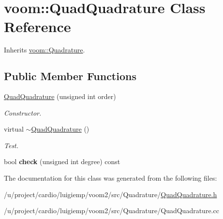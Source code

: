 \hypertarget{classvoom_1_1_quad_quadrature}{
\section{voom::QuadQuadrature Class Reference}
\label{classvoom_1_1_quad_quadrature}
}


Inherits \hyperlink{classvoom_1_1_quadrature}{voom::Quadrature}.\subsection*{Public Member Functions}
\begin{DoxyCompactItemize}
\item 
\hypertarget{classvoom_1_1_quad_quadrature_ad911cb1165ee336da4fc4375b772ca28}{
\hyperlink{classvoom_1_1_quad_quadrature_ad911cb1165ee336da4fc4375b772ca28}{QuadQuadrature} (unsigned int order)}
\label{classvoom_1_1_quad_quadrature_ad911cb1165ee336da4fc4375b772ca28}

\begin{DoxyCompactList}\small\item\em Constructor. \item\end{DoxyCompactList}\item 
\hypertarget{classvoom_1_1_quad_quadrature_ab14e886da0e6b67d44482553b23f9dd2}{
virtual \hyperlink{classvoom_1_1_quad_quadrature_ab14e886da0e6b67d44482553b23f9dd2}{$\sim$QuadQuadrature} ()}
\label{classvoom_1_1_quad_quadrature_ab14e886da0e6b67d44482553b23f9dd2}

\begin{DoxyCompactList}\small\item\em Test. \item\end{DoxyCompactList}\item 
\hypertarget{classvoom_1_1_quad_quadrature_af1a22b14e347ce401638b516f7fc1923}{
bool {\bfseries check} (unsigned int degree) const }
\label{classvoom_1_1_quad_quadrature_af1a22b14e347ce401638b516f7fc1923}

\end{DoxyCompactItemize}


The documentation for this class was generated from the following files:\begin{DoxyCompactItemize}
\item 
/u/project/cardio/luigiemp/voom2/src/Quadrature/\hyperlink{_quad_quadrature_8h}{QuadQuadrature.h}\item 
/u/project/cardio/luigiemp/voom2/src/Quadrature/QuadQuadrature.cc\end{DoxyCompactItemize}
